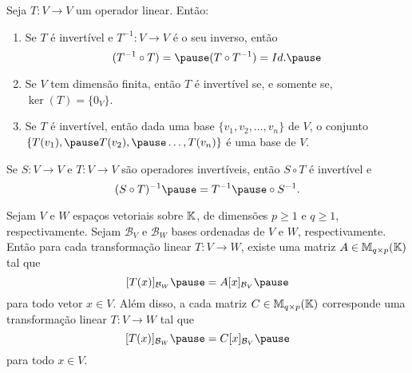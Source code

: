 \documentclass{beamer}
\begin{document}
\begin{frame}
    \begin{proposicao}
        Seja $T \colon V \to V$ um operador linear. \pause Então:
        \begin{enumerate}[label={\roman*})]
            \item Se $T$ é invertível \pause e $T^{-1} \colon V \to V$ é o seu inverso, \pause então
                \[
                    (T^{-1} \circ T) = \pause (T \circ T^{-1}) =  Id.\pause
                \]

            \vspace{.5cm}

            \item Se $V$ tem dimensão finita, \pause então $T$ é invertível \pause se, e somente se, \pause $\ker(T) = \{0_V\}$.\pause

            \vspace{.5cm}

            \item Se $T$ é invertível, \pause então dada uma base $\{v_1, v_2, \dots, v_n\}$ de $V$, \pause o conjunto $\{T(v_1), \pause T(v_2), \pause \dots, T(v_n)\}$ \pause é uma base de $V$.
        \end{enumerate}
    \end{proposicao}
\end{frame}

\begin{frame}
    \begin{proposicao}
        Se $S \colon V \to V$ e $T \colon V \to V$ \pause são operadores invertíveis, \pause então $S \circ T$ é invertível e\pause
        \[
            (S \circ T)^{-1} \pause = T^{-1} \pause \circ S^{-1}.
        \]
    \end{proposicao}
\end{frame}

\begin{frame}
    \begin{teorema}
        Sejam $V$ e $W$ espaços vetoriais sobre $\mathbb{K}$, \pause de dimensões $p \ge 1$ e $q \ge 1$, respectivamente. \pause Sejam $\mathcal{B}_V$ e $\mathcal{B}_W$ bases ordenadas de $V$ e $W$, respectivamente. \pause Então para cada transformação linear $T \colon V \to W$, \pause existe uma matriz $A \in \mathbb{M}_{q\times p}(\mathbb{K})$ tal que\pause
        \[
            [T(x)]_{\mathcal{B}_W} \pause = A[x]_{\mathcal{B}_V}\pause
        \]
        para todo vetor $x \in V$. \pause Além disso, \pause a cada matriz $C \in \mathbb{M}_{q\times p}(\mathbb{K})$ \pause corresponde uma transformação linear $T \colon V \to W$ tal que\pause
        \[
            [T(x)]_{\mathcal{B}_W} \pause = C[x]_{\mathcal{B}_V}\pause
        \]
        para todo $x \in V$.
    \end{teorema}
\end{frame}
\end{document}

